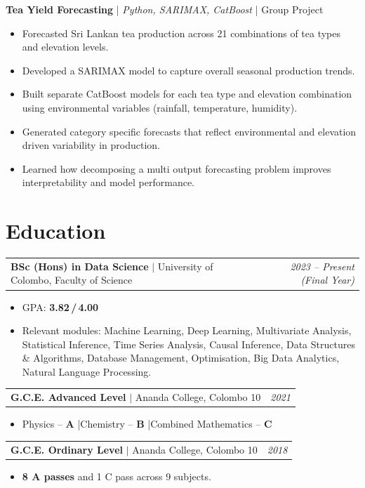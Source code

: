 \documentclass[10pt, a4paper]{article}
\makeatletter
\newcommand{\cventry}[3]{%
  \begin{tabularx}{\linewidth}{@{}X r@{}}
    \textbf{#1} \textcolor{midgray}{$|$ #2} &
    \textit{\textcolor{midgray}{\small #3}}
  \end{tabularx}\vspace{1pt}%
}
\newcommand{\cvproject}[2]{%
  \vspace{5pt}%
  \textbf{#1} \textcolor{midgray}{| \textit{#2} | Group Project}%
  \vspace{1pt}%
}
\newenvironment{cvlist}{%
  \begin{itemize}[leftmargin=1.3em, itemsep=1pt, topsep=2pt, parsep=0pt]
}{%
  \end{itemize}%
}
\makeatother
\begin{document}
\cvproject{Tea Yield Forecasting}{Python, SARIMAX, CatBoost}
\begin{cvlist}
  \item Forecasted Sri Lankan tea production across 21 combinations of tea types and elevation levels.
  \item Developed a SARIMAX model to capture overall seasonal production trends.
  \item Built separate CatBoost models for each tea type and elevation combination using environmental variables (rainfall, temperature, humidity).
  \item Generated category specific forecasts that reflect environmental and elevation driven variability in production.
  \item Learned how decomposing a multi output forecasting problem improves interpretability and model performance.
\end{cvlist}

\pagebreak
\section{Education}

\cventry{BSc (Hons) in Data Science}{University of Colombo, Faculty of Science}{2023 -- Present (Final Year)}
\begin{cvlist}
  \item GPA: \textbf{3.82\,/\,4.00}
  \item Relevant modules: Machine Learning, Deep Learning, Multivariate Analysis, Statistical
        Inference, Time Series Analysis, Causal Inference, Data Structures \& Algorithms,
        Database Management, Optimisation, Big Data Analytics, Natural Language Processing.
\end{cvlist}

\vspace{5pt}

\cventry{G.C.E. Advanced Level}{Ananda College, Colombo 10}{2021}
\begin{cvlist}
  \item Physics -- \textbf{A} \enspace|\enspace Chemistry -- \textbf{B} \enspace|\enspace Combined Mathematics -- \textbf{C}
\end{cvlist}

\vspace{5pt}

\cventry{G.C.E. Ordinary Level}{Ananda College, Colombo 10}{2018}
\begin{cvlist}
  \item \textbf{8 A passes} and 1 C pass across 9 subjects.
\end{cvlist}
\end{document}
